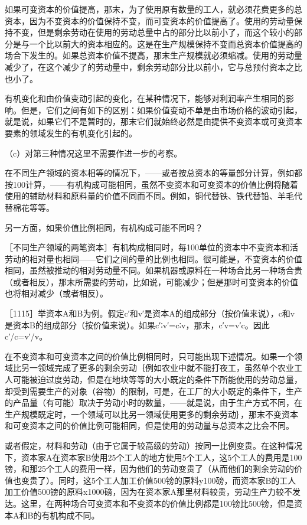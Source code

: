 如果可变资本的价值提高，那末，为了使用原有数量的工人，就必须花费更多的总资本，因为不变资本的价值保持不变，而可变资本的价值提高了。使用的劳动量保持不变，但是剩余劳动在使用的劳动总量中占的部分比以前小了，而这个较小的部分是与一个比以前大的资本相应的。这是在生产规模保持不变而总资本价值提高的场合下发生的。如果总资本价值不提高，那末生产规模就必须缩减。使用的劳动量减少了，在这个减少了的劳动量中，剩余劳动部分比以前小，它与总预付资本之比也小了。

有机变化和由价值变动引起的变化，在某种情况下，能够对利润率产生相同的影响。但是，它们之间有如下的区别：如果价值变动不单是由市场价格的波动引起，就是说，如果它们不是暂时的，那末它们就始终必然是由提供不变资本或可变资本要素的领域发生的有机变化引起的。

（c）对第三种情况这里不需要作进一步的考察。

在不同生产领域的资本相等的情况下，——或者按总资本的等量部分计算，例如都按100计算，——有机构成可能相同，虽然不变资本和可变资本的价值比例将随着使用的辅助材料和原料量的价值不同而不同。例如，铜代替铁、铁代替铅、羊毛代替棉花等等。

另一方面，如果价值比例相同，有机构成可能不同吗？

［不同生产领域的两笔资本］有机构成相同时，每100单位的资本中不变资本和活劳动的相对量也相同——它们之间的量的比例也相同。很可能是，不变资本的价值相同，虽然被推动的相对劳动量不同。如果机器或原料在一种场合比另一种场合贵（或者相反），那末所需要的劳动，比如说，可能减少；但是那时可变资本的价值也将相对减少（或者相反）。

［1115］举资本A和B为例。假定c′和v′是资本A的组成部分（按价值来说），c和v是资本B的组成部分（按价值来说）。如果c′∶v′=c∶v，那末，c′v=v′c。因此c′/c=v′/v。

在不变资本和可变资本之间的价值比例相同时，只可能出现下述情况。如果一个领域比另一领域完成了更多的剩余劳动｛例如农业中就不能打夜工，虽然单个农业工人可能被迫过度劳动，但是在地块等等的大小既定的条件下所能使用的劳动总量，却受到需要生产的对象（谷物）的限制，可是，在工厂的大小既定的条件下，生产的产品量（有可能）取决于劳动小时的数量，——就是说，由于生产方式不同，在生产规模既定时，一个领域可以比另一领域使用更多的剩余劳动｝，那末不变资本和可变资本之间的价值比例可能相同，但是使用的劳动量与总资本之比会不同。

或者假定，材料和劳动（由于它属于较高级的劳动）按同一比例变贵。在这种情况下，资本家A在资本家B使用25个工人的地方使用5个工人，这5个工人的费用是100镑，和那25个工人的费用一样，因为他们的劳动变贵了（从而他们的剩余劳动的价值也变贵了）。同时，这5个工人加工价值500镑的原料y100磅，而资本家B的工人加工价值500镑的原料x1000磅，因为在资本家A那里材料较贵，劳动生产力较不发达。这里，在两种场合可变资本和不变资本的价值比例都是100镑比500镑，但是资本A和B的有机构成不同。

